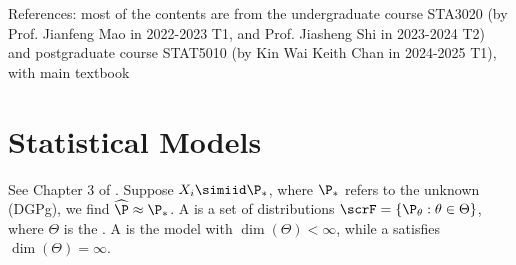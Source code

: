 \documentclass[10pt,a4paper]{article}
\begin{document}
	\MakeScribeTop
	\tableofcontents


References: most of the contents are from the undergraduate course STA3020 (by Prof. Jianfeng Mao in 2022-2023 T1, and Prof. Jiasheng Shi in 2023-2024 T2) and postgraduate course STAT5010 (by Kin Wai Keith Chan in 2024-2025 T1), with main textbook \cite{casella2002statistical} 


\section{Statistical Models}
See Chapter 3 of \cite{casella2002statistical}. Suppose $X_i\simiid \P_*$, where $\P_*$ refers to the unknown  (DGPg), we find $\widehat{\P}\approx \P_*$. A  is a set of distributions $\scrF=\{\P_{\theta}:\theta\in\Theta\}$, where $\Theta$ is the . A  is the model with $\dim(\Theta)<\infty$, while a  satisfies $\dim(\Theta)=\infty$. 
\end{document}
